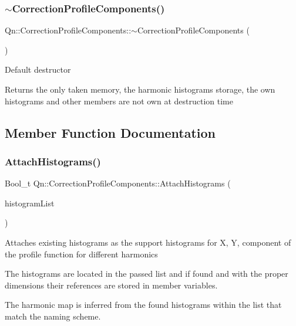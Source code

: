 \subsubsection{\texorpdfstring{$\sim$\+Correction\+Profile\+Components()}{~CorrectionProfileComponents()}}
{\footnotesize\ttfamily Qn\+::\+Correction\+Profile\+Components\+::$\sim$\+Correction\+Profile\+Components (\begin{DoxyParamCaption}{ }\end{DoxyParamCaption})\hspace{0.3cm}{\ttfamily [virtual]}}

Default destructor

Returns the only taken memory, the harmonic histograms storage, the own histograms and other members are not own at destruction time 

\subsection{Member Function Documentation}
\mbox{\label{classQn_1_1CorrectionProfileComponents_adefa34cb026125ea0d52966c470f81af}} 
\subsubsection{\texorpdfstring{Attach\+Histograms()}{AttachHistograms()}}
{\footnotesize\ttfamily Bool\+\_\+t Qn\+::\+Correction\+Profile\+Components\+::\+Attach\+Histograms (\begin{DoxyParamCaption}\item[{T\+List $\ast$}]{histogram\+List }\end{DoxyParamCaption})\hspace{0.3cm}{\ttfamily [virtual]}}

Attaches existing histograms as the support histograms for X, Y, component of the profile function for different harmonics

The histograms are located in the passed list and if found and with the proper dimensions their references are stored in member variables.

The harmonic map is inferred from the found histograms within the list that match the naming scheme.


